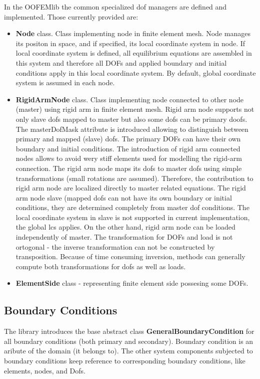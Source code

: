 \documentclass[12pt,draft]{article}
\newcommand{\class}[1]{{\bf #1}}
\newcommand{\attribute}[1]{#1}
\begin{document}
In the OOFEMlib the common specialized dof managers are
defined and implemented. Those currently provided are:
\begin{itemize}
\item
\class{Node} class. Class implementing node in finite element mesh. 
Node manages its positon in space, and if specified, its	
local coordinate system in node. If local coordinate system is defined, all 
equilibrium equations are assembled in this system and therefore all DOFs and
applied  boundary and initial conditions apply in this local coordinate system.
By default, global coordinate system is assumed in each node.
\item
\class{RigidArmNode} class.	
Class implementing node connected to other node (master) using rigid arm in finite element mesh. 
Rigid arm node supports not only slave dofs mapped to master
but also some dofs can be primary doofs. The \attribute{masterDofMask}
attribute is introduced allowing to
distinguish between primary and mapped (slave) dofs. 
The primary DOFs can have their own boundary and initial conditions.
The introduction of rigid arm connected nodes allows to avoid wery stiff elements used
for modelling the rigid-arm connection. The rigid arm node maps its dofs to master dofs
using simple transformations (small rotations are assumed). Therefore, the contribution
to rigid arm node are localized directly to master related equations.
The rigid arm node slave (mapped dofs can not have its own boundary or initial conditions,
they are determined completely from master dof conditions. 
The local coordinate system in slave is not supported in current implementation, the global lcs applies.
On the other hand, rigid arm node can be loaded independently of master.
The transformation for DOFs and load is not ortogonal - the in\-ver\-se tran\-sfor\-ma\-tion can 
not be constructed by transposition. Because of time consuming inversion, methods 
can generally compute both transformations for dofs as well as loads.
\item
\class{ElementSide} class - representing finite element side possesing
some DOFs.
\end{itemize}

\subsection{Boundary Conditions}
The library introduces the base abstract class \class{GeneralBoundaryCondition} for all boundary
conditions (both primary and secondary). 
Boundary condition is an aribute of the domain (it belongs to).
The other system components subjected to boundary conditions keep reference to corresponding boundary
conditions, like elements, nodes, and Dofs.
	
\end{document}

